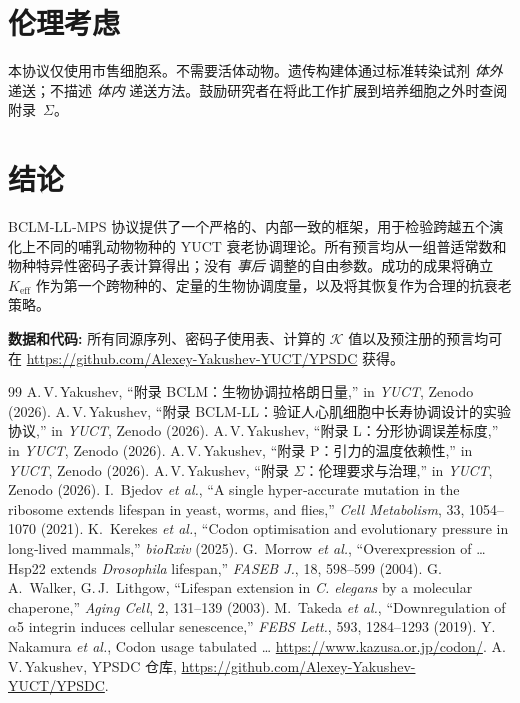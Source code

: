 \documentclass[12pt,a4paper]{article}
\newcommand{\REL}{\mathcal{K}}          %
\begin{document}
	\section{伦理考虑}
	\label{sec:ethics}
	本协议仅使用市售细胞系。不需要活体动物。遗传构建体通过标准转染试剂 \textit{体外} 递送；不描述 \textit{体内} 递送方法。鼓励研究者在将此工作扩展到培养细胞之外时查阅附录~\(\Sigma\)。
	
	\section{结论}
	\label{sec:conclusion}
	BCLM‑LL‑MPS 协议提供了一个严格的、内部一致的框架，用于检验跨越五个演化上不同的哺乳动物物种的 YUCT 衰老协调理论。所有预言均从一组普适常数和物种特异性密码子表计算得出；没有 \textit{事后} 调整的自由参数。成功的成果将确立 \(K_{\mathrm{eff}}\) 作为第一个跨物种的、定量的生物协调度量，以及将其恢复作为合理的抗衰老策略。
	
	\vspace{0.5cm}
	\noindent\textbf{数据和代码:} 所有同源序列、密码子使用表、计算的 \(\REL\) 值以及预注册的预言均可在 \url{https://github.com/Alexey-Yakushev-YUCT/YPSDC} 获得。
	
	\begin{thebibliography}{99}
		 A.\,V.\,Yakushev, ``附录 BCLM：生物协调拉格朗日量,'' in \emph{YUCT}, Zenodo (2026).
		 A.\,V.\,Yakushev, ``附录 BCLM‑LL：验证人心肌细胞中长寿协调设计的实验协议,'' in \emph{YUCT}, Zenodo (2026).
		 A.\,V.\,Yakushev, ``附录 L：分形协调误差标度,'' in \emph{YUCT}, Zenodo (2026).
		 A.\,V.\,Yakushev, ``附录 P：引力的温度依赖性,'' in \emph{YUCT}, Zenodo (2026).
		 A.\,V.\,Yakushev, ``附录 \(\Sigma\)：伦理要求与治理,'' in \emph{YUCT}, Zenodo (2026).
		 I.~Bjedov \emph{et al.}, ``A single hyper‑accurate mutation in the ribosome extends lifespan in yeast, worms, and flies,'' \emph{Cell Metabolism}, 33, 1054–1070 (2021).
		 K.~Kerekes \emph{et al.}, ``Codon optimisation and evolutionary pressure in long‑lived mammals,'' \emph{bioRxiv} (2025).
		 G.~Morrow \emph{et al.}, ``Overexpression of … Hsp22 extends \textit{Drosophila} lifespan,'' \emph{FASEB J.}, 18, 598–599 (2004).
		 G.\,A.~Walker, G.\,J.~Lithgow, ``Lifespan extension in \textit{C. elegans} by a molecular chaperone,'' \emph{Aging Cell}, 2, 131–139 (2003).
		 M.~Takeda \emph{et al.}, ``Downregulation of \(\alpha\)5 integrin induces cellular senescence,'' \emph{FEBS Lett.}, 593, 1284–1293 (2019).
		 Y.\,Nakamura \emph{et al.}, Codon usage tabulated … \url{https://www.kazusa.or.jp/codon/}.
		 A.\,V.\,Yakushev, YPSDC 仓库, \url{https://github.com/Alexey-Yakushev-YUCT/YPSDC}.
	\end{thebibliography}
	
\end{document}
